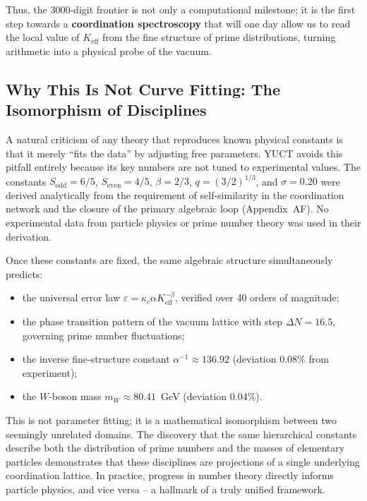 \documentclass[12pt,a4paper]{article}
\theoremstyle{remark}
\begin{document}
	Thus, the 3000‑digit frontier is not only a computational milestone; it is the first step towards a \textbf{coordination spectroscopy} that will one day allow us to read the local value of $K_{\mathrm{eff}}$ from the fine structure of prime distributions, turning arithmetic into a physical probe of the vacuum.
	
\subsection{Why This Is Not Curve Fitting: The Isomorphism of Disciplines}

A natural criticism of any theory that reproduces known physical constants is that it merely ``fits the data'' by adjusting free parameters. YUCT avoids this pitfall entirely because its key numbers are not tuned to experimental values. The constants \(S_{\mathrm{odd}} = 6/5\), \(S_{\mathrm{even}} = 4/5\), \(\beta = 2/3\), \(q = (3/2)^{1/3}\), and \(\sigma = 0.20\) were derived analytically from the requirement of self-similarity in the coordination network and the closure of the primary algebraic loop (Appendix~AF). No experimental data from particle physics or prime number theory was used in their derivation.

Once these constants are fixed, the same algebraic structure simultaneously predicts:
\begin{itemize}
	\item the universal error law \(\varepsilon = \kappa_c \alpha K_{\mathrm{eff}}^{-\beta}\), verified over 40 orders of magnitude;
	\item the phase transition pattern of the vacuum lattice with step \(\Delta N = 16.5\), governing prime number fluctuations;
	\item the inverse fine-structure constant \(\alpha^{-1} \approx 136.92\) (deviation 0.08\% from experiment);
	\item the \(W\)-boson mass \(m_W \approx 80.41\)~GeV (deviation 0.04\%).
\end{itemize}

This is not parameter fitting; it is a mathematical isomorphism between two seemingly unrelated domains. The discovery that the same hierarchical constants describe both the distribution of prime numbers and the masses of elementary particles demonstrates that these disciplines are projections of a single underlying coordination lattice. In practice, progress in number theory directly informs particle physics, and vice versa -- a hallmark of a truly unified framework.
\end{document}
